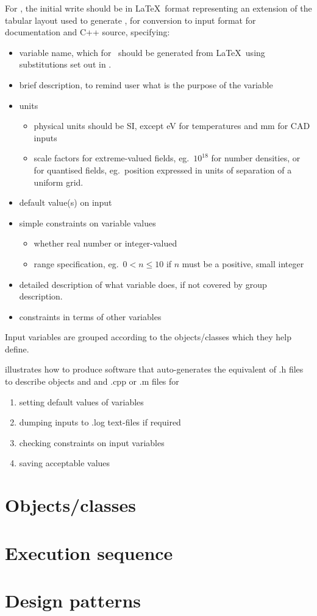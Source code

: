 For \nep, the initial write should be in  \LaTeX \ format representing an extension
of the tabular layout used to generate , for conversion to  input
format for documentation and C++ source, specifying:
\begin{itemize}
\item variable name, which for \nep \ should be generated from \LaTeX \ using
substitutions set out in .
\item brief description, to remind user what is the purpose of the variable
\item units
\begin{itemize}
\item physical units should be SI, except eV for temperatures and mm for CAD inputs
\item scale factors for extreme-valued fields, eg.\ $10^{18}$  for number densities, 
or for quantised fields, eg.\ position expressed in units of separation of a uniform grid.
\end{itemize}
\item default value(s) on input
\item simple constraints on variable values
\begin{itemize}
\item whether real number or integer-valued
\item range specification, eg.\ $0 <  n \leq 10$ if $n$ must be a positive, small integer
\end{itemize}
\item detailed description of what variable does, if not covered by group description.
\item constraints in terms of other variables
\end{itemize}
Input variables are grouped according to the objects/classes which they help define.

 illustrates how to produce software that auto-generates the equivalent
of .h files to describe objects and and .cpp or .m  files for 
\begin{enumerate}
\item setting default values of variables
\item dumping inputs to .log text-files if required
\item checking constraints on input variables
\item saving acceptable values 
\end{enumerate}

\clearpage
\section{Objects/classes}\label{sec:DDF_objects}

\clearpage
\section{Execution sequence}\label{sec:DDF_sequence}

\section{Design patterns}\label{sec:desi_patt}

